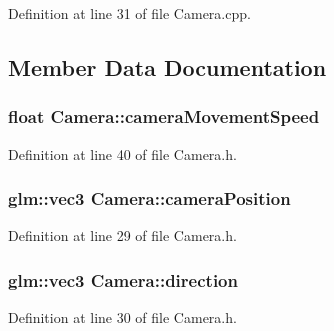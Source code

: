 Definition at line 31 of file Camera.\+cpp.



\subsection{Member Data Documentation}
\hypertarget{class_camera_a0ca21737f5a9fb6a9fda61e7e92c9a5e}{}
\subsubsection[{camera\+Movement\+Speed}]{\setlength{\rightskip}{0pt plus 5cm}float Camera\+::camera\+Movement\+Speed\hspace{0.3cm}{\ttfamily [private]}}\label{class_camera_a0ca21737f5a9fb6a9fda61e7e92c9a5e}


Definition at line 40 of file Camera.\+h.

\hypertarget{class_camera_aca1334c1a10c3a1fe84a2979b205ff9a}{}
\subsubsection[{camera\+Position}]{\setlength{\rightskip}{0pt plus 5cm}glm\+::vec3 Camera\+::camera\+Position\hspace{0.3cm}{\ttfamily [private]}}\label{class_camera_aca1334c1a10c3a1fe84a2979b205ff9a}


Definition at line 29 of file Camera.\+h.

\hypertarget{class_camera_aa91491698db51f70c62199d8c2213514}{}
\subsubsection[{direction}]{\setlength{\rightskip}{0pt plus 5cm}glm\+::vec3 Camera\+::direction\hspace{0.3cm}{\ttfamily [private]}}\label{class_camera_aa91491698db51f70c62199d8c2213514}


Definition at line 30 of file Camera.\+h.

\hypertarget{class_camera_aad9d573147be409e929251eca0bea339}{}
